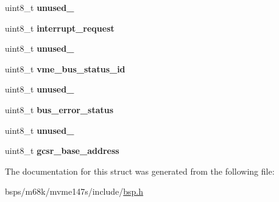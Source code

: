 \begin{DoxyCompactItemize}
\mbox{\label{structvme__lcsr__map_a662ae5c22ac21eafe63dd5cb585160b1}} 
uint8\+\_\+t {\bfseries unused\+\_}
\item 
\mbox{\label{structvme__lcsr__map_ad1f32acdc0a65d19db1c1a02d7826531}} 
uint8\+\_\+t {\bfseries interrupt\+\_\+request}
\item 
\mbox{\label{structvme__lcsr__map_a3393e94485a2ea94a18fecf915247aac}} 
uint8\+\_\+t {\bfseries unused\+\_}
\item 
\mbox{\label{structvme__lcsr__map_a847402dadc849ef50f19a475ad314316}} 
uint8\+\_\+t {\bfseries vme\+\_\+bus\+\_\+status\+\_\+id}
\item 
\mbox{\label{structvme__lcsr__map_a2f6014b9e7a079e4ad4c221c0a7fee7d}} 
uint8\+\_\+t {\bfseries unused\+\_}
\item 
\mbox{\label{structvme__lcsr__map_af10ff931b79cd62717a644fd8d2ed520}} 
uint8\+\_\+t {\bfseries bus\+\_\+error\+\_\+status}
\item 
\mbox{\label{structvme__lcsr__map_a4445dd770ded5c1d8fa312e9dd58627e}} 
uint8\+\_\+t {\bfseries unused\+\_}
\item 
\mbox{\label{structvme__lcsr__map_a78778fcdcf6f00b3968a9cfc8b848578}} 
uint8\+\_\+t {\bfseries gcsr\+\_\+base\+\_\+address}
\end{DoxyCompactItemize}


The documentation for this struct was generated from the following file\+:\begin{DoxyCompactItemize}
\item 
bsps/m68k/mvme147s/include/\mbox{\hyperlink{bsps_2m68k_2mvme147s_2include_2bsp_8h}{bsp.\+h}}\end{DoxyCompactItemize}
